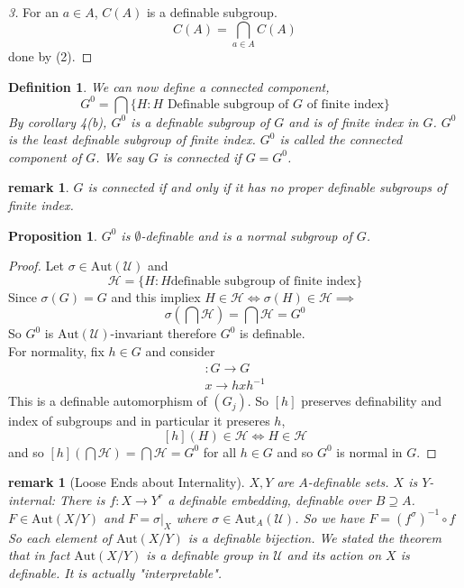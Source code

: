 \documentclass[letterpaper, 12pt]{article}
\newcommand{\fin}{\qquad \quad \hfill \framebox[1.75mm][l]{\,}}
\newcommand{\cU}{\mathcal{U}}
\newcommand{\cH}{\mathcal{H}}
\newcommand{\Aut}{\mbox{Aut}}
\theoremstyle{stdthm}
\newtheorem{prop}[thm]{Proposition}
\theoremstyle{stddef}
\newtheorem{defn}[thm]{Definition}
\newtheorem{rem}[thm]{remark} %
\theoremstyle{stdnonum}
\theoremstyle{stdqands}
\theoremstyle{stdbold}
\begin{document}
\begin{proof} [3]
For an $a\in A$, $C(A)$ is a definable subgroup. 
\[ C(A) = \bigcap_{a\in A} C(A) \]
done by (2). 
\end{proof}


\begin{defn}
We can now define a connected component, 
\[ G^0 = \bigcap \{H:H \mbox{ Definable subgroup of $G$ of finite index}\}\] 
By corollary 4(b), $G^0$ is a definable subgroup of $G$ and is of finite index in $G$. $G^0$ is the least definable subgroup of finite index. $G^0$ is called the connected component of $G$. We say $G$ is connected if $G = G^0$. 
\end{defn}

\begin{rem}
$G$ is connected if and only if it has no proper definable subgroups of finite index. 
\end{rem}


\begin{prop}
$G^0$ is $\emptyset$-definable and is a normal subgroup of $G$. 
\end{prop}

\begin{proof}
Let $\sigma \in \Aut(\cU)$ and 
\[ \cH = \{H: H \mbox{definable subgroup of finite index}\} \]
Since $\sigma(G) = G$ and this impliex $H \in \cH \iff \sigma(H) \in \cH \implies$
\[ \sigma \left( \bigcap \cH \right) = \bigcap \cH = G^0 \]
So $G^0$ is $\Aut(\cU)$-invariant therefore $G^0$ is definable. \\

For normality, fix $h \in G$ and consider 
\begin{align*}
[h] : G \to G \\
x \to hxh^{-1} 
\end{align*}
This is a definable automorphism of $(G_j)$. So $[h]$ preserves definability and index of subgroups and in particular it preseres $h$, 
\[ [h](H) \in \cH \iff H \in \cH \]
and so $[h] \left( \bigcap \cH \right) = \bigcap \cH = G^0$ for all $h \in G$ and so $G^0$ is normal in $G$. 
\end{proof}



\begin{rem} [Loose Ends about Internality]
$X,Y$ are $A$-definable sets. $X$ is $Y$-internal: There is $f:X\to Y^r$ a definable embedding, definable over $B\supseteq A$. $F \in \Aut(X/Y)$ and $F = \sigma|_X$  where $\sigma \in \Aut_A(\cU)$. So we have $F = (f^\sigma)^{-1} \circ f$ So each element of $\Aut(X/Y)$ is a definable bijection. We stated the theorem that in fact $\Aut(X/Y)$ is a definable group in $\cU$ and its action on $X$ is definable. It is actually "interpretable". 
\end{rem}
\end{document}
